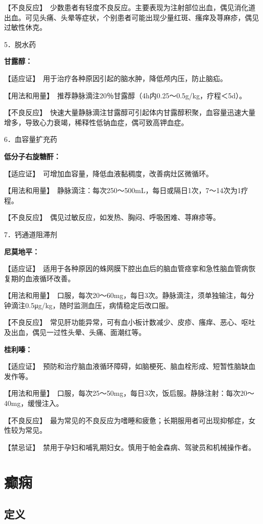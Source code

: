 【不良反应】　少数患者有轻度不良反应。主要表现为注射部位出血，偶见消化道出血。可见头痛、头晕等症状，个别患者可能出现少量红斑、瘙痒及荨麻疹，偶见过敏性休克。

5．脱水药

\textbf{甘露醇：}

【适应证】　用于治疗各种原因引起的脑水肿，降低颅内压，防止脑疝。

【用法和用量】　推荐静脉滴注20％甘露醇（4h内0.25～0.5g/kg，疗程＜5d）。

【不良反应】　快速大量静脉滴注甘露醇可引起体内甘露醇积聚，血容量迅速大量增多，导致心力衰竭，稀释性低钠血症，偶可致高钾血症。

6．血容量扩充药

\textbf{低分子右旋糖酐：}

【适应证】　可增加血容量，降低血液黏稠度，改善病灶区微循环。

【用法和用量】　静脉滴注：每次250～500mL，每日或隔日1次，7～14次为1疗程。

【不良反应】　偶见过敏反应，如发热、胸闷、呼吸困难、荨麻疹等。

7．钙通道阻滞剂

\textbf{尼莫地平：}

【适应证】　适用于各种原因的蛛网膜下腔出血后的脑血管痉挛和急性脑血管病恢复期的血液循环改善。

【用法和用量】　口服，每次20～60mg，每日3次。静脉滴注，须单独输注，每分钟滴注0.5μg/kg，随时监测血压，病情稳定后改口服。

【不良反应】　常见肝功能异常，可有血小板计数减少、皮疹、瘙痒、恶心、呕吐及出血，偶见一过性头晕、头痛、面潮红等。

\textbf{桂利嗪：}

【适应证】　预防和治疗脑血液循环障碍，如脑梗死、脑血栓形成、短暂性脑缺血发作等。

【用法和用量】　口服，每次25～50mg，每日3次，饭后服。静脉注射：每次20～40mg，缓慢注入。

【不良反应】　最为常见的不良反应为嗜睡和疲惫；长期服用者可出现抑郁症，女性较为常见。

【禁忌证】　禁用于孕妇和哺乳期妇女。慎用于帕金森病、驾驶员和机械操作者。

\section{癫痫}

\subsection{定义}

